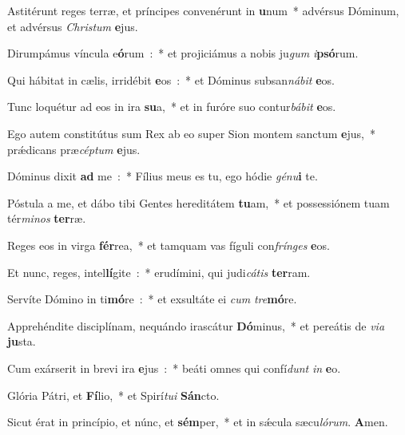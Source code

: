 \item Astitérunt reges terræ, et príncipes convenérunt in \textbf{u}num~* advérsus Dóminum, et advérsus \emph{Chri}\emph{stum} \textbf{e}jus.
\item Dirumpámus víncula e\textbf{ó}rum~:~* et projiciámus a nobis ju\emph{gum} \emph{i}\textbf{psó}rum.
\item Qui hábitat in cælis, irridébit \textbf{e}os~:~* et Dóminus subsan\emph{ná}\emph{bit} \textbf{e}os.
\item Tunc loquétur ad eos in ira \textbf{su}a,~* et in furóre suo contur\emph{bá}\emph{bit} \textbf{e}os.
\item Ego autem constitútus sum Rex ab eo super Sion montem sanctum \textbf{e}jus,~* prǽdicans præ\emph{cép}\emph{tum} \textbf{e}jus.
\item Dóminus dixit \textbf{ad} me~:~* Fílius meus es tu, ego hódie \emph{gé}\emph{nu}\textbf{i} te.
\item Póstula a me, et dábo tibi Gentes hereditátem \textbf{tu}am,~* et possessiónem tuam tér\emph{mi}\emph{nos} \textbf{ter}ræ.
\item Reges eos in virga \textbf{fér}rea,~* et tamquam vas fíguli con\emph{frín}\emph{ges} \textbf{e}os.
\item Et nunc, reges, intel\textbf{lí}gite~:~* erudímini, qui judi\emph{cá}\emph{tis} \textbf{ter}ram.
\item Servíte Dómino in ti\textbf{mó}re~:~* et exsultáte ei \emph{cum} \emph{tre}\textbf{mó}re.
\item Apprehéndite disciplínam, nequándo irascátur \textbf{Dó}minus,~* et pereátis de \emph{vi}\emph{a} \textbf{ju}sta.
\item Cum exárserit in brevi ira \textbf{e}jus~:~* beáti omnes qui confí\emph{dunt} \emph{in} \textbf{e}o.
\item Glória Pátri, et \textbf{Fí}lio,~* et Spirí\emph{tu}\emph{i} \textbf{Sán}cto.
\item Sicut érat in princípio, et núnc, et \textbf{sém}per,~* et in sǽcula sæcu\emph{ló}\emph{rum}. \textbf{A}men.
